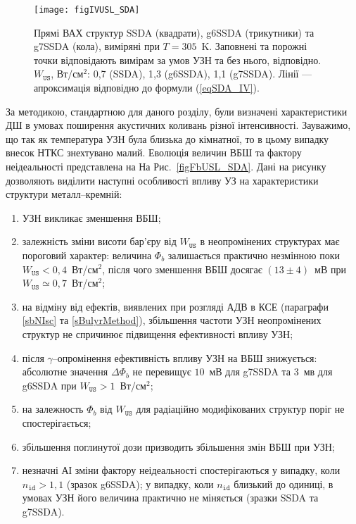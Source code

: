 \begin{figure}[b]
\center
\texttt{[image: figIVUSL\_SDA]}
\caption{\label{figIVUSL_SDA}
Прямі  ВАХ  структур SSDA (квадрати), g6SSDA (трикутники) та g7SSDA (кола), виміряні при $T=305$~K.
Заповнені та порожні точки відповідають вимірам за умов УЗН та без нього, відповідно.
$W_\mathtt{US}$, Вт/см$^2$: 0,7 (SSDA), 1,3 (g6SSDA), 1,1 (g7SSDA).
Лінії --- апроксимація відповідно до формули (\ref{eqSDA_IV}).
}%
\end{figure}

За методикою, стандартною для даного розділу, були визначені характеристики ДШ в умовах поширення акустичних коливань різної інтенсивності.
Зауважимо, що так як температура УЗН була близька до кімнатної, то в цьому випадку внесок НТКС знехтувано малий.
Еволюція величин ВБШ та фактору неідеальності представлена на На Рис.~\ref{figFbUSL_SDA}.
Дані на рисунку дозволяють виділити наступні особливості  впливу УЗ на характеристики структури металл--кремній:
\begin{enumerate}[label=\asbuk*),leftmargin=0em,itemindent=1.5em]
\item УЗН викликає зменшення ВБШ;

\item залежність зміни висоти бар'єру від $W_\mathtt{US}$ в неопромінених структурах має пороговий характер:
     величина $\Phi_b$ залишається практично незмінною поки \mbox{$W_\mathtt{US}<0,4$~Вт/см$^2$}, після чого
    зменшення ВБШ досягає $(13\pm4)$~мВ при $W_\mathtt{US}\simeq0,7$~Вт/см$^2$;

\item на відміну від ефектів, виявлених при розгляді АДВ в КСЕ (параграфи \ref{sbNIsc} та \ref{sBulyrMethod}), збільшення частоти УЗН неопромінених структур не спричинює
підвищення ефективності впливу УЗН;

\item після $\gamma$--опромінення ефективність впливу УЗН на ВБШ знижується:
абсолютне значення $\Delta\Phi_b$ не перевищує $10$~мВ для g7SSDA та $3$~мв  для g6SSDA при $W_\mathtt{US}>1$~Вт/см$^2$;

\item на залежность $\Phi_b$ від $W_\mathtt{US}$ для радіаційно модифікованих структур поріг не спостерігається;

\item збільшення поглинутої дози призводить збільшення змін ВБШ при УЗН;

\item незначні АІ зміни фактору неідеальності спостерігаються у випадку, коли $n_\mathtt{id}>1,1$ (зразок g6SSDA);
    у випадку, коли $n_\mathtt{id}$ близький до одиниці, в умовах УЗН його величина практично не міняється (зразки SSDA та g7SSDA).
\end{enumerate}

